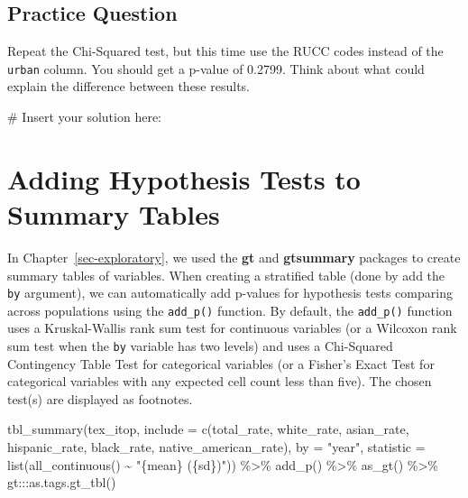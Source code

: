 \documentclass[
  letterpaper,
]{krantz}
\makeatletter
\newenvironment{Shaded}{\begin{snugshade}}{\end{snugshade}}
\newcommand{\AttributeTok}[1]{\textcolor[rgb]{0.40,0.45,0.13}{#1}}
\newcommand{\CommentTok}[1]{\textcolor[rgb]{0.37,0.37,0.37}{#1}}
\newcommand{\FunctionTok}[1]{\textcolor[rgb]{0.28,0.35,0.67}{#1}}
\newcommand{\NormalTok}[1]{\textcolor[rgb]{0.00,0.23,0.31}{#1}}
\newcommand{\SpecialCharTok}[1]{\textcolor[rgb]{0.37,0.37,0.37}{#1}}
\newcommand{\StringTok}[1]{\textcolor[rgb]{0.13,0.47,0.30}{#1}}
\newenvironment{kframe}{%
\medskip{}
\setlength{\fboxsep}{.8em}
 \def\at@end@of@kframe{}%
 \ifinner\ifhmode%
  \def\at@end@of@kframe{\end{minipage}}%
  \begin{minipage}{\columnwidth}%
 \fi\fi%
 \def\FrameCommand##1{\hskip\@totalleftmargin \hskip-\fboxsep
 \colorbox{shadecolor}{##1}\hskip-\fboxsep
     \hskip-\linewidth \hskip-\@totalleftmargin \hskip\columnwidth}%
 \MakeFramed {\advance\hsize-\width
   \@totalleftmargin\z@ \linewidth\hsize
   \@setminipage}}%
 {\par\unskip\endMakeFramed%
 \at@end@of@kframe}
\renewenvironment{Shaded}{\begin{kframe}}{\end{kframe}}
\makeatother
\begin{document}
\hypertarget{practice-question-19}{%
\subsection{Practice Question}\label{practice-question-19}}

Repeat the Chi-Squared test, but this time use the RUCC codes instead of
the \texttt{urban} column. You should get a p-value of 0.2799. Think
about what could explain the difference between these results.

\begin{Shaded}
\begin{Highlighting}[]
\CommentTok{\# Insert your solution here:}
\end{Highlighting}
\end{Shaded}

\hypertarget{adding-hypothesis-tests-to-summary-tables}{%
\section{Adding Hypothesis Tests to Summary
Tables}\label{adding-hypothesis-tests-to-summary-tables}}

In Chapter~\ref{sec-exploratory}, we used the \textbf{gt} and
\textbf{gtsummary} packages to create summary tables of variables. When
creating a stratified table (done by add the \texttt{by} argument), we
can automatically add p-values for hypothesis tests comparing across
populations using the \texttt{add\_p()} function. By default, the
\texttt{add\_p()} function uses a Kruskal-Wallis rank sum test for
continuous variables (or a Wilcoxon rank sum test when the \texttt{by}
variable has two levels) and uses a Chi-Squared Contingency Table Test
for categorical variables (or a Fisher's Exact Test for categorical
variables with any expected cell count less than five). The chosen
test(s) are displayed as footnotes.

\begin{Shaded}
\begin{Highlighting}[]
\FunctionTok{tbl\_summary}\NormalTok{(tex\_itop, }\AttributeTok{include =} \FunctionTok{c}\NormalTok{(total\_rate, white\_rate, asian\_rate, }
\NormalTok{                                  hispanic\_rate, black\_rate, }
\NormalTok{                                  native\_american\_rate),}
           \AttributeTok{by =} \StringTok{"year"}\NormalTok{, }
           \AttributeTok{statistic =} \FunctionTok{list}\NormalTok{(}\FunctionTok{all\_continuous}\NormalTok{() }\SpecialCharTok{\textasciitilde{}} \StringTok{"\{mean\} (\{sd\})"}\NormalTok{)) }\SpecialCharTok{\%\textgreater{}\%} 
  \FunctionTok{add\_p}\NormalTok{() }\SpecialCharTok{\%\textgreater{}\%}
  \FunctionTok{as\_gt}\NormalTok{() }\SpecialCharTok{\%\textgreater{}\%} 
\NormalTok{  gt}\SpecialCharTok{:::}\FunctionTok{as.tags.gt\_tbl}\NormalTok{()}
\end{Highlighting}
\end{Shaded}
\end{document}
